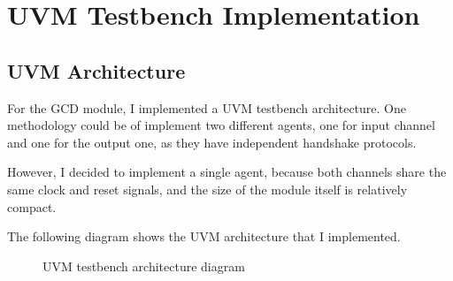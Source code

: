 \section{UVM Testbench Implementation}

\subsection{UVM Architecture}

For the GCD module, I implemented a UVM testbench architecture. One methodology could be of implement two different agents, one for input channel and one for the output one, as they have independent handshake protocols.

However, I decided to implement a single agent, because both channels share the same clock and reset signals, and the size of the module itself is relatively compact.

The following diagram shows the UVM architecture that I implemented.

\begin{figure}[H]
    \centering
    
    \caption{UVM testbench architecture diagram}
    \label{fig:uvm_diagram}
\end{figure}


